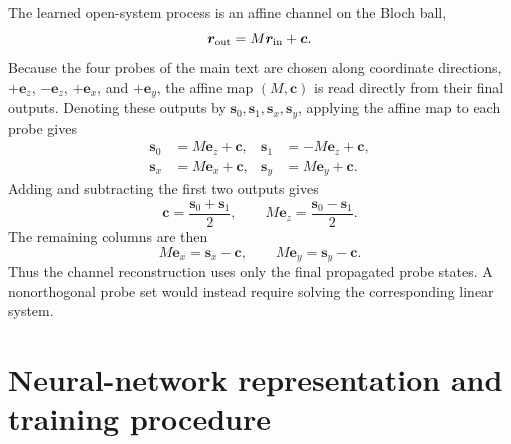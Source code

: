 \documentclass[aps,prx,reprint,superscriptaddress,nofootinbib,longbibliography,floatfix,showkeys]{revtex4-2}
\newcommand{\rr}{\bm r}
\newcommand{\rin}{\rr_{\rm in}}
\newcommand{\rout}{\rr_{\rm out}}
\begin{document}
The learned open-system process is an affine channel on the Bloch ball,
\begin{equation}
    \rout=M\rin+\bm c .
\end{equation}
Because the four probes of the main text are chosen along coordinate
directions, $+\bm e_z$, $-\bm e_z$, $+\bm e_x$, and $+\bm e_y$, the affine
map $(M,\bm c)$ is read directly from their final outputs.  Denoting these
outputs by $\bm s_0,\bm s_1,\bm s_x,\bm s_y$, applying the affine map to
each probe gives
\begin{equation}
\begin{aligned}
    \bm s_0 &= M\bm e_z+\bm c, &
    \bm s_1 &=-M\bm e_z+\bm c,\\
    \bm s_x &= M\bm e_x+\bm c, &
    \bm s_y &= M\bm e_y+\bm c .
\end{aligned}
\label{eq:probe_affine_relations}
\end{equation}
Adding and subtracting the first two outputs gives
\begin{equation}
    \bm c=\frac{\bm s_0+\bm s_1}{2},
    \qquad
    M\bm e_z=\frac{\bm s_0-\bm s_1}{2}.
\end{equation}
The remaining columns are then
\begin{equation}
    M\bm e_x=\bm s_x-\bm c,
    \qquad
    M\bm e_y=\bm s_y-\bm c.
\end{equation}
Thus the channel reconstruction uses only the final propagated probe states.
A nonorthogonal probe set would instead require solving the corresponding
linear system.


\section{Neural-network representation and training procedure}
\label{supp:pinn}
\end{document}
